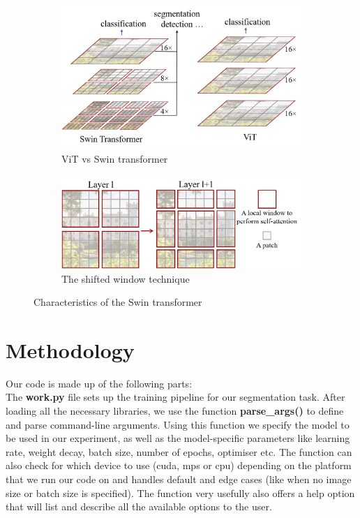 \documentclass[a4paper,11pt]{article}
\begin{document}
\begin{figure}[ht]
    \centering
    \begin{subfigure}{0.45\textwidth}
        \centering
        \includegraphics[width=\linewidth]{teaser11.png}
        \caption{ViT vs Swin transformer}
        \label{fig:swin-vit}
    \end{subfigure}\hfill
    \begin{subfigure}{0.45\textwidth}
        \centering
        \includegraphics[width=\linewidth]{teaser_v4.png}
        \caption{The shifted window technique}
        \label{fig:shiftwindow}
    \end{subfigure}
    \caption{Characteristics of the Swin transformer\cite{DBLP:journals/corr/abs-2103-14030}}
    \label{fig:swintransform}
\end{figure}

\section{Methodology}

Our code is made up of the following parts: \\
The \textbf{work.py} file sets up the training pipeline for our segmentation task. After loading all the necessary libraries, we use the function \textbf{parse\_args()} to define and parse command-line arguments. Using this function  we specify the model to be used in our experiment, as well as the model-specific parameters like learning rate, weight decay, batch size, number of epochs, optimiser etc. The function can also check for which device to use (cuda, mps or cpu) depending on the platform that we run our code on and handles default and edge cases (like when no image size or batch size is specified). The function very usefully also offers a help option that will list and describe all the available options to the user. 
\end{document}
